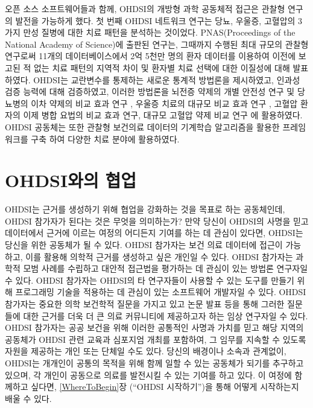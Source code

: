 \documentclass[11pt]{book}
\theoremstyle{definition}
\theoremstyle{definition}
\theoremstyle{definition}
\theoremstyle{remark}
\begin{document}
오픈 소스 소프트웨어들과 함께, OHDSI의 개방형 과학 공동체적 접근은
관찰형 연구의 발전을 가능하게 했다. 첫 번째 OHDSI 네트워크 연구는 당뇨,
우울증, 고혈압의 3가지 만성 질병에 대한 치료 패턴을 분석하는 것이었다.
PNAS(Proceedings of the National Academy of Science)에 출판된 연구는,
그때까지 수행된 최대 규모의 관찰형 연구로써 11개의 데이터베이스에서 2억
5천만 명의 환자 데이터를 이용하여 이전에 보고된 적 없는 치료 패턴의
지역적 차이 및 환자별 치료 선택에 대한 이질성에 대해 발표하였다.
\citep{Hripcsak7329} OHDSI는 교란변수를 통제하는 새로운 통계적 방법론을
제시하였고, \citep{tian_2018} 인과성 검증 능력에 대해 검증하였고,
\citep{schuemie_2018} 이러한 방법론을 뇌전증 약제의 개별 안전성 연구
\citep{duke_2017} 및 당뇨병의 이차 약제의 비교 효과 연구
\citep{vashisht_2018}, 우울증 치료의 대규모 비교 효과 연구
\citep{schuemie_2018b}, 고혈압 환자의 이제 병합 요법의 비교 효과
연구\citep{you_olmesartan_2019}, 대규모 고혈압 약제 비교
연구\citep{suchard_comprehensive_2019} 에 활용하였다. OHDSI 공동체는
또한 관찰형 보건의료 데이터의 기계학습 알고리즘을 활용한 프레임 워크를
구축 \citep{reps2018} 하여 다양한 치료 분야에 활용하였다.
\citep{johnston_2019, cepeda_2018, reps_2019}

\hypertarget{ohdsi-}{\section{OHDSI와의 협업}\label{ohdsi-}}

OHDSI는 근거를 생성하기 위해 협업을 강화하는 것을 목표로 하는
공동체인데, OHDSI 참가자가 된다는 것은 무엇을 의미하는가? 만약 당신이
OHDSI의 사명을 믿고 데이터에서 근거에 이르는 여정의 어디든지 기여를 하는
데 관심이 있다면, OHDSI는 당신을 위한 공동체가 될 수 있다. OHDSI
참가자는 보건 의료 데이터에 접근이 가능하고, 이를 활용해 의학적 근거를
생성하고 싶은 개인일 수 있다. OHDSI 참가자는 과학적 모범 사례를 수립하고
대안적 접근법을 평가하는 데 관심이 있는 방법론 연구자일 수 있다. OHDSI
참가자는 OHDSI의 타 연구자들이 사용할 수 있는 도구를 만들기 위해
프로그래밍 기술을 적용하는 데 관심이 있는 소프트웨어 개발자일 수 있다.
OHDSI 참가자는 중요한 의학 보건학적 질문을 가지고 있고 논문 발표 등을
통해 그러한 질문들에 대한 근거를 더욱 더 큰 의료 커뮤니티에 제공하고자
하는 임상 연구자일 수 있다. OHDSI 참가자는 공공 보건을 위해 이러한
공통적인 사명과 가치를 믿고 해당 지역의 공동체가 OHDSI 관련 교육과
심포지엄 개최를 포함하여, 그 임무를 지속할 수 있도록 자원을 제공하는
개인 또는 단체일 수도 있다. 당신의 배경이나 소속과 관계없이, OHDSI는
개개인이 공통의 목적을 위해 함께 일할 수 있는 공동체가 되기를 추구하고
있으며, 각 개인이 공동으로 의료를 발전시킬 수 있는 기여를 하고 있다. 이
여정에 함께하고 싶다면, \ref{WhereToBegin}장 (``OHDSI 시작하기'')을 통해
어떻게 시작하는지 배울 수 있다.
\end{document}
